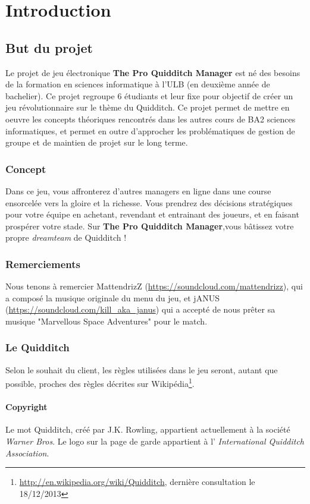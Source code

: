 \documentclass[a4paper, 11pt]{report}
\begin{document}

\tableofcontents

\chapter{Introduction}

\section{But du projet}
Le projet de jeu électronique \textbf{The Pro Quidditch Manager} est né des besoins de la formation
en sciences informatique à l'ULB (en deuxième année de bachelier). Ce projet regroupe 6 étudiants et leur fixe pour objectif de créer un jeu révolutionnaire sur le thème du Quidditch. Ce projet permet
de mettre en oeuvre les concepts théoriques rencontrés dans les autres cours de 
BA2 sciences informatiques, et permet en outre d'approcher les problématiques de 
gestion de groupe et de maintien de projet sur le long terme.

\subsection{Concept}
Dans ce jeu, vous affronterez d'autres \gls{manager}s en ligne dans une course ensorcelée
vers la gloire et la richesse. Vous prendrez des décisions stratégiques pour votre
équipe en achetant, revendant et entrainant des joueurs, et en faisant prospérer votre stade. 
Sur \textbf{The Pro Quidditch Manager},vous bâtissez votre propre \textit{dreamteam} de Quidditch !

\subsection{Remerciements}
Nous tenons à remercier MattendrizZ (\url{https://soundcloud.com/mattendrizz}), qui a composé la musique originale du menu du jeu, et jANUS
(\url{https://soundcloud.com/kill_aka_janus}) qui a accepté de nous prêter sa musique "Marvellous Space Adventures" pour le match.

\subsection{Le Quidditch}
Selon le souhait du client, les règles utilisées dans le jeu seront, autant que possible, proches des règles décrites sur Wikipédia\footnote{\url{http://en.wikipedia.org/wiki/Quidditch}, dernière consultation le 18/12/2013}.

\subsubsection*{Copyright}
Le mot Quidditch, créé par J.K. Rowling, appartient actuellement à la société \emph{Warner Bros}.
Le logo sur la page de garde appartient à l' \emph{International Quidditch Association}.
\end{document}
